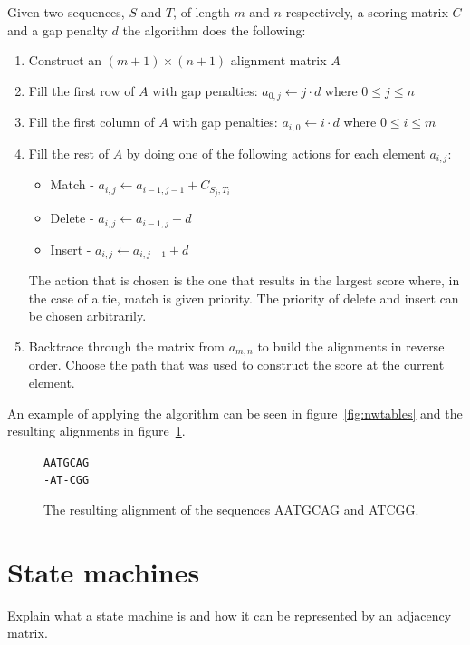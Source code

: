 \documentclass[a4paper]{report}
\begin{document}
Given two sequences, $S$ and $T$, of length $m$ and $n$ respectively, a scoring
matrix $C$ and a gap penalty $d$ the algorithm does the following:

\begin{enumerate}
    \item Construct an $(m + 1) \times (n + 1)$ alignment matrix $A$
    \item Fill the first row of $A$ with gap penalties: $a_{0,j} \gets j \cdot
        d$ where $0 \le j \le n$
    \item Fill the first column of $A$ with gap penalties: $a_{i,0} \gets i
        \cdot d$ where $0 \le i \le m$
    \item Fill the rest of $A$ by doing one of the following actions for each
        element $a_{i,j}$:
        \begin{itemize}
            \item Match - $a_{i,j} \gets a_{i - 1, j - 1} + C_{S_j,T_i}$
            \item Delete - $a_{i,j} \gets a_{i - 1, j} + d$
            \item Insert - $a_{i,j} \gets a_{i, j - 1} + d$
        \end{itemize}
        The action that is chosen is the one that results in the largest score
        where, in the case of a tie, match is given priority. The priority of
        delete and insert can be chosen arbitrarily.
    \item Backtrace through the matrix from $a_{m,n}$ to build the alignments
        in reverse order. Choose the path that was used to construct the score
        at the current element.
\end{enumerate}

An example of applying the algorithm can be seen in figure~\ref{fig:nwtables}
and the resulting alignments in figure~\ref{fig:align}.

\begin{figure}[h]
    \centering
    \texttt{AATGCAG\\-AT-CGG}
    \caption{The resulting alignment of the sequences AATGCAG and ATCGG.}
    \label{fig:align}
\end{figure}

\section{State machines}
Explain what a state machine is and how it can be represented by an adjacency
matrix.
\end{document}
